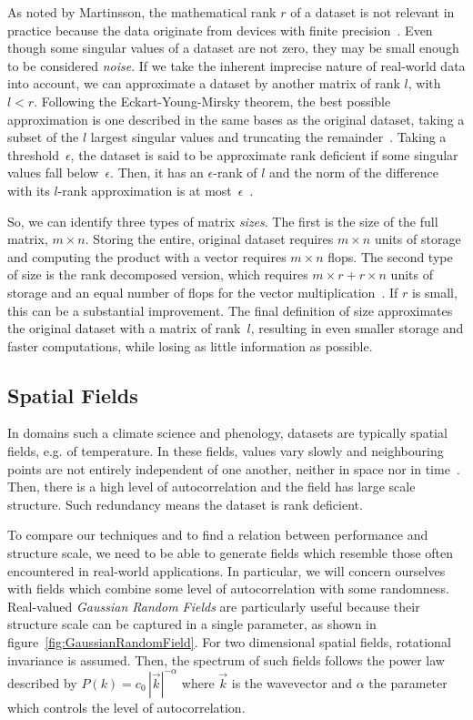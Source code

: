 \documentclass[sigconf]{acmart}
\begin{document}
\enlargethispage{2mm}
As noted by Martinsson, the mathematical rank $r$ of a dataset is not relevant in practice because the data originate from devices with finite precision~\cite{Martinsson2016}. Even though some singular values of a dataset are not zero, they may be small enough to be considered \textit{noise}. If we take the inherent imprecise nature of real-world data into account, we can approximate a dataset by another matrix of rank $l$, with $l < r$. Following the Eckart-Young-Mirsky theorem, the best possible approximation is one described in the same bases as the original dataset, taking a subset of the $l$ largest singular values and truncating the remainder~\cite{Eckart1936}. Taking a threshold~$\epsilon$, the dataset is said to be approximate rank deficient if some singular values fall below~$\epsilon$. Then, it has an $\epsilon$-rank of $l$ and the norm of the difference with its $l$-rank approximation is at most~$\epsilon$~\cite{Martinsson2016}.

So, we can identify three types of matrix \textit{sizes}. The first is the size of the full matrix, $m \times n$. Storing the entire, original dataset requires $m \times n$ units of storage and computing the product with a vector requires $m \times n$ flops. The second type of size is the rank decomposed version, which  requires $m \times r + r \times n$ units of storage and an equal number of flops for the vector multiplication~\cite{Martinsson2016}. If $r$ is small, this can be a substantial improvement. The final definition of size approximates the original dataset with a matrix of rank~$l$, resulting in even smaller storage and faster computations, while losing as little information as possible.

\subsection{Spatial Fields}
\label{sec:Introduction Spatial Fields}

In domains such a climate science and phenology, datasets are typically spatial fields, e.g. of temperature. In these fields, values vary slowly and neighbouring points are not entirely independent of one another, neither in space nor in time~\cite{Eshel2011}. Then, there is a high level of autocorrelation and the field has large scale structure. Such redundancy means the dataset is rank deficient.

To compare our techniques and to find a relation between performance and structure scale, we need to be able to generate fields which resemble those often encountered in real-world applications. In particular, we will concern ourselves with fields which combine some level of autocorrelation with some randomness. Real-valued \textit{Gaussian Random Fields} are particularly useful because their structure scale can be captured in a single parameter, as shown in figure~\ref{fig:GaussianRandomField}. For two dimensional spatial fields, rotational invariance is assumed. Then, the spectrum of such fields follows the power law described by $P(k) = c_{0} \, |\vec{k}|^{-\alpha}$ where $\vec{k}$ is the wavevector and $\alpha$ the parameter which controls the level of autocorrelation.
\end{document}
